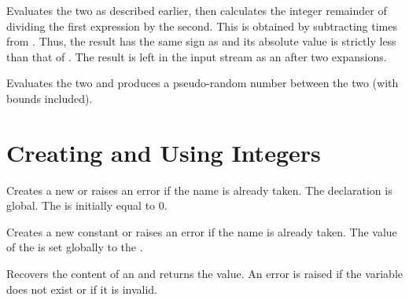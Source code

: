 \documentclass[oneside]{book}
\begin{document}
\begin{function}{\intMathMod}
\begin{syntax}
  
\end{syntax}
Evaluates the two  as described earlier,
then calculates the integer remainder of dividing the first
expression by the second.  This is obtained by subtracting
   times
 from .  Thus, the result has the
same sign as  and its absolute value is strictly
less than that of .  The result is left in the input
stream as an  after two expansions.
\end{function}

\begin{function}{\intMathRand}
\begin{syntax}
  
\end{syntax}
Evaluates the two  and produces a
pseudo-random number between the two (with bounds included).
\end{function}

\section{Creating and Using Integers}

\begin{function}{\intNew}
\begin{syntax}
 
\end{syntax}
Creates a new  or raises an error if the name is
already taken. The declaration is global. The  is
initially equal to $0$.
\end{function}

\begin{function}{\intConst}
\begin{syntax}
  
\end{syntax}
Creates a new constant  or raises an error if the name
is already taken. The value of the  is set
globally to the .
\end{function}

\begin{function}{\intUse}
\begin{syntax}
 
\end{syntax}
Recovers the content of an  and returns the value.
An error is raised if the variable does not exist or if it is invalid.
\end{function}
\end{document}
